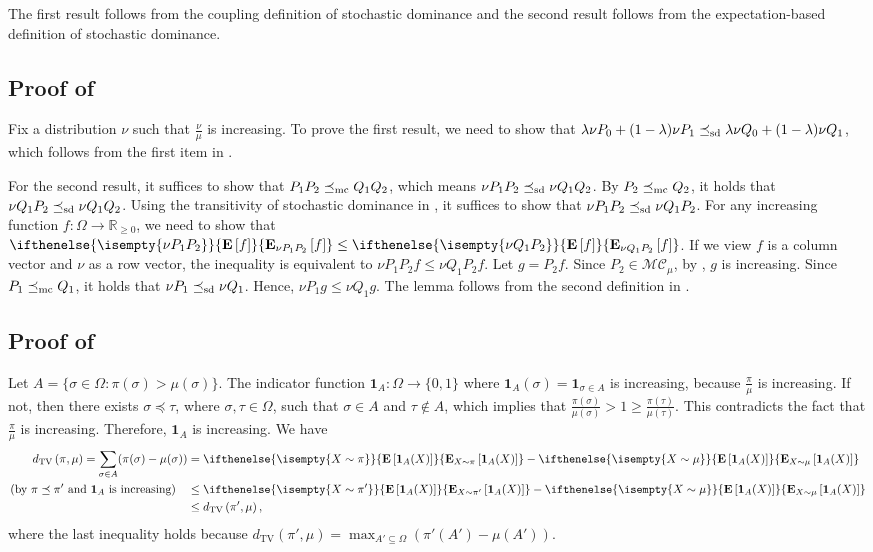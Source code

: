 \documentclass[11pt,a4paper]{article}
\newcommand{\DTV}[2]{d_{\mathrm{TV}}\left({#1},{#2}\right)}
\newcommand{\mc}{\preceq_{\textnormal{mc}}}
\newcommand{\sd}{\preceq_{\textnormal{sd}}}
\theoremstyle{definition}
\def\*#1{\mathbf{#1}} %
\def\+#1{\mathcal{#1}} %
\newcommand{\E}[2][]{ \ifthenelse{\isempty{#1}}
  {\mathbf{\mathbf{E}}\left[#2\right]}
  {\mathbf{\mathbf{E}}_{#1}\left[#2\right]} }
\begin{document}
The first result follows from the coupling definition of stochastic dominance and the second result follows from the expectation-based definition of stochastic dominance.







\subsection{Proof of \texorpdfstring{}{}}

Fix a distribution $\nu$ such that $\frac{\nu}{\mu}$ is increasing. To prove the first result, we need to show that $\lambda \nu P_0 + (1-\lambda) \nu P_1 \sd \lambda \nu Q_0 + (1-\lambda) \nu Q_1$, which follows from the first item in .

For the second result, it suffices to show that $P_1P_2 \mc Q_1Q_2$, which means $\nu P_1P_2 \sd \nu Q_1Q_2$. By $P_2 \mc Q_2$, it holds that $\nu Q_1 P_2 \sd \nu Q_1 Q_2$. Using the transitivity of stochastic dominance in , it suffices to show that $\nu P_1 P_2 \sd \nu Q_1 P_2$. For any increasing function $f: \Omega \to \mathbb{R}_{\geq 0}$, we need to show that $\E[\nu P_1 P_2 ]{f} \leq \E[\nu Q_1 P_2 ]{f}$. If we view $f$ is a column vector and $\nu$ as a row vector, the inequality is equivalent to $\nu P_1 P_2 f \leq \nu Q_1 P_2 f$. Let $g = P_2 f$. Since $P_2 \in \+{MC}_\mu$, by , $g$ is increasing. Since $P_1 \mc Q_1$, it holds that $\nu P_1 \sd \nu Q_1$. Hence, $\nu P_1 g \leq \nu Q_1 g$. The lemma follows from the second definition in .


\subsection{Proof of \texorpdfstring{}{}}
Let $A=\{\sigma \in \Omega:\pi(\sigma)>\mu(\sigma)\}$. The indicator function $\*1_A:\Omega \to \{0,1\}$ where $\*1_A(\sigma) = \*1_{\sigma \in A}$ is  increasing, because $\frac{\pi}{\mu}$ is increasing. If not, then there exists $\sigma \preceq \tau$, where $\sigma,\tau \in \Omega$, such that $\sigma \in A$ and $\tau \notin A$, which implies that $\frac{\pi(\sigma)}{\mu(\sigma)}> 1 \geq \frac{\pi(\tau)}{\mu(\tau)}$. This contradicts the fact that $\frac{\pi}{\mu}$ is increasing. Therefore, $\*1_A$ is increasing. We have   
\begin{align*}
\DTV{\pi}{\mu}=\sum_{\sigma\in A}(\pi(\sigma)-\mu(\sigma))&=\E[X\sim \pi]{\*1_A(X)}- \E[X\sim \mu]{\*1_A(X)}   \\
\text{(by~$\pi \preceq \pi'$ and $\*1_A$ is increasing)}\quad &\leq \E[X\sim \pi']{\*1_A(X)}- \E[X\sim \mu]{\*1_A(X)}\\
&\leq \DTV{\pi'}{\mu},
\end{align*}
where the last inequality holds because $\DTV{\pi'}{\mu}=\max_{A'\subseteq \Omega}(\pi'(A')-\mu(A'))$.
\end{document}
